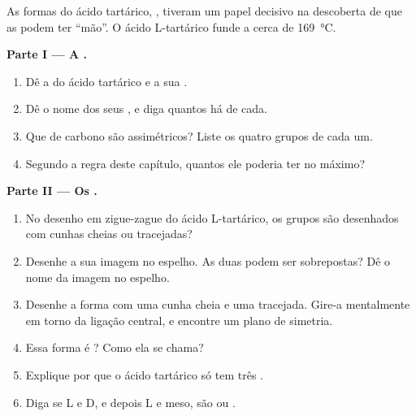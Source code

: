 \begin{problem}
\label{pb:g12:stereochemistry:1}
As formas do ácido tartárico, , tiveram um
papel decisivo na descoberta de que as  podem ter ``mão''. O
ácido L-tartárico funde a cerca de \qty{169}{\celsius}.

\medskip
\noindent\textbf{Parte I --- A .}
\begin{enumerate}
  \item Dê a  do ácido tartárico e a sua .
  \item Dê o nome dos seus , e diga quantos há de cada.
  \item Que  de carbono são assimétricos? Liste os quatro grupos de
        cada um.
  \item Segundo a regra deste capítulo, quantos  ele
        poderia ter no máximo?
\end{enumerate}

\medskip
\noindent\textbf{Parte II --- Os .}
\begin{enumerate}[resume]
  \item No desenho em zigue-zague do ácido L-tartárico, os grupos
         são desenhados com cunhas cheias ou tracejadas?
  \item Desenhe a sua imagem no espelho. As duas podem ser sobrepostas?
        Dê o nome da imagem no espelho.
  \item Desenhe a forma com uma cunha cheia e uma tracejada. Gire-a
        mentalmente em torno da ligação central, e encontre um plano de
        simetria.
  \item Essa forma é ? Como ela se chama?
  \item Explique por que o ácido tartárico só tem três .
  \item Diga se L e D, e depois L e meso, são  ou
        .
\end{enumerate}


\end{problem}
